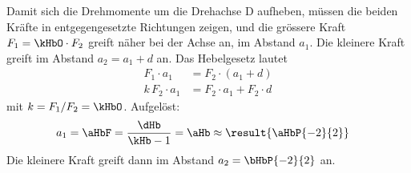 \begin{center}
\end{center}

Damit sich die Drehmomente um die Drehachse D aufheben, müssen die beiden Kräfte in entgegengesetzte Richtungen zeigen, und die grössere Kraft $F_1 = \kHbO\cdot F_2$ greift näher bei der Achse an, im Abstand $a_1$. Die kleinere Kraft greift im Abstand $a_2 = a_1 + d$ an. Das Hebelgesetz lautet
\begin{align}
 F_1\cdot a_1 &= F_2\cdot\left(a_1 + d\right) \\
 k\,F_2\cdot a_1 &= F_2\cdot a_1 + F_2\cdot d
\end{align}
mit $k = F_1/F_2 = \kHbO$. Aufgelöst:
\begin{align}
 a_1 &= \aHbF = \frac{\dHb}{\kHb-1} = \aHb \approx \result{\aHbP{-2}{2}}
\end{align}
Die kleinere Kraft greift dann im Abstand $a_2 = \bHbP{-2}{2}$ an.
